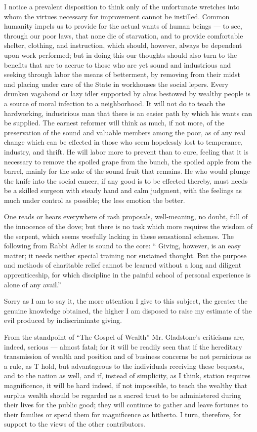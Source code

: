 \documentclass[11pt,openany]{book}
\begin{document}
I notice a prevalent disposition to think only of the unfortunate wretches into whom the virtues necessary for improvement cannot be instilled. Common humanity impels us to provide for the actual wants of human beings --- to see, through our poor laws, that none die of starvation, and to provide comfortable shelter, clothing, and instruction, which should, however, always be dependent upon work performed; but in doing this our thoughts should also turn to the benefits that are to accrue to those who are yet sound and industrious and seeking through labor the means of betterment, by removing from their midst and placing under care of the State in workhouses the social lepers. Every drunken vagabond or lazy idler supported by alms bestowed by wealthy people is a source of moral infection to a neighborhood. It will not do to teach the hardworking, industrious man that there is an easier path by which his wants can be supplied. The earnest reformer will think as much, if not more, of the preservation of the sound and valuable members among the poor, as of any real change which can be effected in those who seem hopelessly lost to temperance, industry, and thrift. He will labor more to prevent than to cure, feeling that it is necessary to remove the spoiled grape from the bunch, the spoiled apple from the barrel, mainly for the sake of the sound fruit that remains. He who would plunge the knife into the social cancer, if any good is to be effected thereby, must needs be a skilled surgeon with steady hand and calm judgment, with the feelings as much under control as possible; the less emotion the better.

One reads or hears everywhere of rash proposals, well-meaning, no doubt, full of the innocence of the dove; but there is no task which more requires the wisdom of the serpent, which seems woefully lacking in these sensational schemes. The following from Rabbi Adler is sound to the core: `` Giving, however, is an easy matter; it needs neither special training nor sustained thought. But the purpose and methods of charitable relief cannot be learned without a long and diligent apprenticeship, for which discipline in the painful school of personal experience is alone of any avail.''

Sorry as I am to say it, the more attention I give to this subject, the greater the genuine knowledge obtained, the higher I am disposed to raise my estimate of the evil produced by indiscriminate giving.

From the standpoint of ``The Gospel of Wealth'' Mr. Gladstone's criticisms are, indeed, serious --- almost fatal; for it will be readily seen that if the hereditary transmission of wealth and position and of business concerns be not pernicious as a rule, as T hold, but advantageous to the individuals receiving these bequests, and to the nation as well, and if, instead of simplicity, as I think, station requires magnificence, it will be hard indeed, if not impossible, to teach the wealthy that surplus wealth should be regarded as a sacred trust to be administered during their lives for the public good; they will continue to gather and leave fortunes to their families or spend them for magnificence as hitherto. I turn, therefore, for support to the views of the other contributors.
\end{document}
